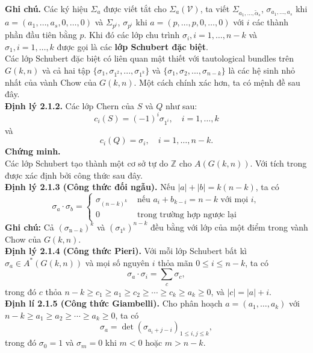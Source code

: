 \documentclass[11pt,a4paper]{book}
\begin{document}
\textbf{Ghi chú.} 
Các ký hiệu \( \Sigma_a \) được viết tắt cho \( \Sigma_a(\mathcal{V}) \), ta viết \( \Sigma_{a_1, \ldots, \tilde{\alpha}_s} \), \( \sigma_{a_1, \ldots, a_s} \) khi \( a=\left(a_1, \ldots, a_s, 0, \ldots, 0\right) \) và \( \Sigma_{p^i} \), \( \sigma_{p^i} \) khi \( a=(p, \ldots, p, 0, \ldots, 0) \) với \( i \) các thành phần đầu tiên bằng \( p \). Khi đó các lớp chu trình \( \sigma_i, i=1, \ldots, n-k \) và \( \sigma_1, i=1, \ldots, k \) được gọi là các \textbf{lớp Schubert đặc biệt}.\\
Các lớp Schubert đặc biệt có liên quan mật thiết với tautological bundles trên $G(k,n)$ và cả hai tập $\{\sigma_{1},\sigma_{1^2},...,\sigma_{1^k}\}$ và $\{\sigma_{1},\sigma_2,...,\sigma_{n-k}\}$ là các hệ sinh nhỏ nhất của vành Chow của $G(k,n)$. Một cách chính xác hơn, ta có mệnh đề sau đây.\\
\textbf{Định lý 2.1.2.}
Các lớp Chern của \( S \) và \( Q \) như sau:
\[
c_i(S)=(-1)^i \sigma_{1^i}, \quad i=1, \ldots, k
\]
và
\[
c_i(Q)=\sigma_i, \quad i=1, \ldots, n-k.
\]
\textbf{Chứng minh.}\\
Các lớp Schubert tạo thành một cơ sở tự do $\mathbb{Z}$ cho $A(G(k,n))$. Với tích trong được xác định bởi công thức sau đây.\\
\textbf{Định lý 2.1.3 (Công thức đối ngẫu).}
Nếu \( |a|+|b|=k(n-k) \), ta có
\[
\sigma_a \cdot \sigma_b= \begin{cases}\sigma_{(n-k)^k} & \text{ nếu } a_i+b_{k-i}=n-k \text{ với mọi } i, \\ 0 & \text{ trong trường hợp ngược lại }\end{cases}
\]
\textbf{Ghi chú:} 
Cả \( \left(\sigma_{\mathrm{n}-k}\right)^k \) và \( \left(\sigma_{1^k}\right)^{n-k} \) đều bằng với lớp của một điểm trong vành Chow của \( G(k, n) \).\\
\textbf{Định lý 2.1.4 (Công thức Pieri).}
Với mỗi lớp Schubert bất kì \( \sigma_a \in A^*(G(k, n)) \) và mọi số nguyên \( i \) thỏa mãn \( 0 \leq i \leq n-k \), ta có
\[
\sigma_a \cdot \sigma_i=\sum_c \sigma_c,
\]
trong đó \( c \) thỏa \( n-k \geq c_1 \geq a_1 \geq c_2 \geq \cdots \geq c_k \geq a_k \geq 0 \), và \( |c|=|a|+i \).\\
\textbf{Định lí 2.1.5 (Công thức Giambelli).}
Cho phân hoạch \( a=\left(a_1, \ldots, a_k\right) \) với \( n-k \geq a_1 \geq a_2 \geq \cdots \geq a_k \geq 0 \), ta có
\[
\sigma_a=\operatorname{det}\left(\sigma_{a_i+j-i}\right)_{1 \leq i, j \leq k},
\]
trong đó \( \sigma_0=1 \) và \( \sigma_m=0 \) khi \( m<0 \) hoặc \( m>n-k \).\\
\end{document}
